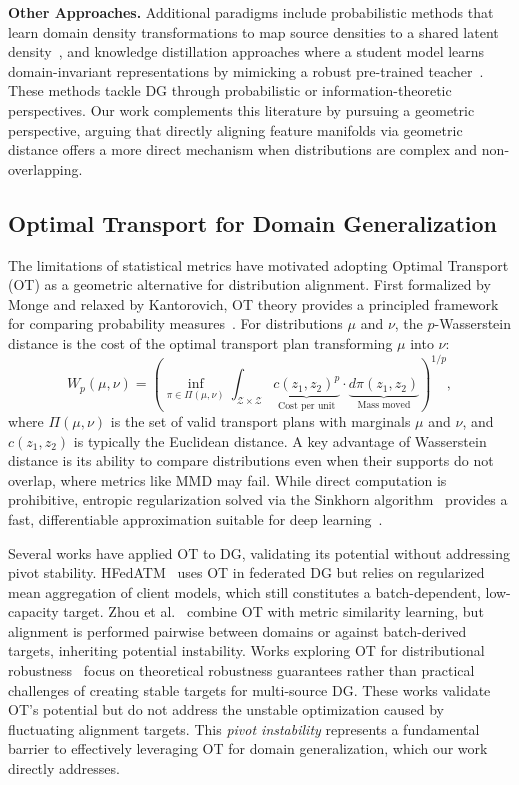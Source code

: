 \documentclass[preprint,12pt]{elsarticle}
\begin{document}
\textbf{Other Approaches.} Additional paradigms include probabilistic methods that learn domain density transformations to map source densities to a shared latent density~\citep{gong2016domain}, and knowledge distillation approaches where a student model learns domain-invariant representations by mimicking a robust pre-trained teacher~\citep{niu2024knowledge}. These methods tackle DG through probabilistic or information-theoretic perspectives. Our work complements this literature by pursuing a geometric perspective, arguing that directly aligning feature manifolds via geometric distance offers a more direct mechanism when distributions are complex and non-overlapping.

\subsection{Optimal Transport for Domain Generalization}

The limitations of statistical metrics have motivated adopting Optimal Transport (OT) as a geometric alternative for distribution alignment. First formalized by Monge and relaxed by Kantorovich, OT theory provides a principled framework for comparing probability measures~\citep{villani2009optimal}. For distributions $\mu$ and $\nu$, the $p$-Wasserstein distance is the cost of the optimal transport plan transforming $\mu$ into $\nu$:
\begin{equation}
    W_p(\mu, \nu) = \left( \inf_{\pi \in \Pi(\mu, \nu)} \int_{\mathcal{Z} \times \mathcal{Z}} \underbrace{c(z_1, z_2)^p}_{\text{Cost per unit}} \cdot \underbrace{d\pi(z_1, z_2)}_{\text{Mass moved}} \right)^{1/p},
\end{equation}
where $\Pi(\mu, \nu)$ is the set of valid transport plans with marginals $\mu$ and $\nu$, and $c(z_1, z_2)$ is typically the Euclidean distance. A key advantage of Wasserstein distance is its ability to compare distributions even when their supports do not overlap, where metrics like MMD may fail. While direct computation is prohibitive, entropic regularization solved via the Sinkhorn algorithm~\citep{cuturi2013sinkhorn} provides a fast, differentiable approximation suitable for deep learning~\citep{peyre2019computational}.

Several works have applied OT to DG, validating its potential without addressing pivot stability. HFedATM~\citep{wang2021hfedatm} uses OT in federated DG but relies on regularized mean aggregation of client models, which still constitutes a batch-dependent, low-capacity target. Zhou et al.~\citep{zhou2021domain} combine OT with metric similarity learning, but alignment is performed pairwise between domains or against batch-derived targets, inheriting potential instability. Works exploring OT for distributional robustness~\citep{gao2023optimal} focus on theoretical robustness guarantees rather than practical challenges of creating stable targets for multi-source DG. These works validate OT's potential but do not address the unstable optimization caused by fluctuating alignment targets. This \textit{pivot instability} represents a fundamental barrier to effectively leveraging OT for domain generalization, which our work directly addresses.
\end{document}

